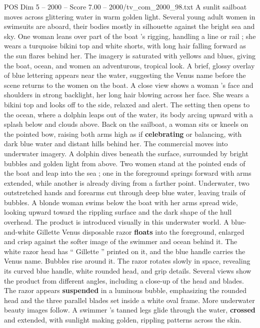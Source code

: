 \begin{textsample}{POS Dim 5 – 2000 – Score 7.00 – 2000/tv\_com\_2000\_98.txt}  \label{ex:f5_pos_030}
A sunlit sailboat moves across glittering water in warm golden light.
Several young adult women in swimsuits are aboard, their bodies mostly in silhouette against the bright sea and sky.
One woman leans over part of the boat ’s rigging, handling a line or rail ; she wears a turquoise bikini top and white shorts, with long hair falling forward as the sun flares behind her.
The imagery is saturated with yellows and blues, giving the boat, ocean, and women an adventurous, tropical look.
A brief, glossy overlay of blue lettering appears near the water, suggesting the Venus name before the scene returns to the women on the boat.
A close view shows a woman ’s face and shoulders in strong backlight, her long hair blowing across her face.
She wears a bikini top and looks off to the side, relaxed and alert.
The setting then opens to the ocean, where a dolphin leaps out of the water, its body arcing upward with a splash below and clouds above.
Back on the sailboat, a woman sits or kneels on the pointed bow, raising both arms high as if \textbf{celebrating} or balancing, with dark blue water and distant hills behind her.
The commercial moves into underwater imagery.
A dolphin dives beneath the surface, surrounded by bright bubbles and golden light from above.
Two women stand at the pointed ends of the boat and leap into the sea ; one in the foreground springs forward with arms extended, while another is already diving from a farther point.
Underwater, two outstretched hands and forearms cut through deep blue water, leaving trails of bubbles.
A blonde woman swims below the boat with her arms spread wide, looking upward toward the rippling surface and the dark shape of the hull overhead.
The product is introduced visually in this underwater world.
A blue-and-white Gillette Venus disposable razor \textbf{floats} into the foreground, enlarged and crisp against the softer image of the swimmer and ocean behind it.
The white razor head has “ Gillette ” printed on it, and the blue handle carries the Venus name.
Bubbles rise around it.
The razor rotates slowly in space, revealing its curved blue handle, white rounded head, and grip details.
Several views show the product from different angles, including a close-up of the head and blades.
The razor appears \textbf{suspended} in a luminous bubble, emphasizing the rounded head and the three parallel blades set inside a white oval frame.
More underwater beauty images follow.
A swimmer ’s tanned legs glide through the water, \textbf{crossed} and extended, with sunlight making golden, rippling patterns across the skin.

\end{textsample}
